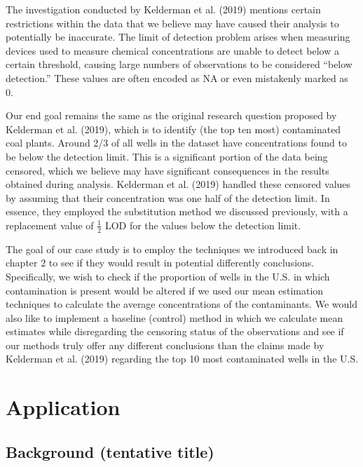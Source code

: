 \documentclass[12pt, twoside]{amherstthesis}
\begin{document}
The investigation conducted by Kelderman et al. (2019) mentions certain restrictions within the data that we believe may have caused their analysis to potentially be inaccurate. The limit of detection problem arises when measuring devices used to measure chemical concentrations are unable to detect below a certain threshold, causing large numbers of observations to be considered ``below detection.'' These values are often encoded as NA or even mistakenly marked as 0.

Our end goal remains the same as the original research question proposed by Kelderman et al. (2019), which is to identify (the top ten most) contaminated coal plants. Around 2/3 of all wells in the dataset have concentrations found to be below the detection limit. This is a significant portion of the data being censored, which we believe may have significant consequences in the results obtained during analysis. Kelderman et al. (2019) handled these censored values by assuming that their concentration was one half of the detection limit. In essence, they employed the substitution method we discussed previously, with a replacement value of \(\frac{1}{2}\) LOD for the values below the detection limit.

The goal of our case study is to employ the techniques we introduced back in chapter 2 to see if they would result in potential differently conclusions. Specifically, we wish to check if the proportion of wells in the U.S. in which contamination is present would be altered if we used our mean estimation techniques to calculate the average concentrations of the contaminants. We would also like to implement a baseline (control) method in which we calculate mean estimates while disregarding the censoring status of the observations and see if our methods truly offer any different conclusions than the claims made by Kelderman et al. (2019) regarding the top 10 most contaminated wells in the U.S.

\hypertarget{application}{%
\section{Application}\label{application}}

\hypertarget{background-tentative-title}{%
\subsection{Background (tentative title)}\label{background-tentative-title}}
\end{document}
